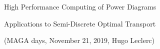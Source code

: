 \documentclass[aspectratio=169]{beamer}
\begin{document}
\begin{frame}
    \begin{center}
        {\huge High Performance Computing of Power Diagrams}

        \bigskip
        {\large Applications to Semi-Discrete Optimal Transport}
      
        \vfill
        {(MAGA days, November 21, 2019, Hugo Leclerc)}
    \end{center}
\end{frame}

\section{}
\end{document}
